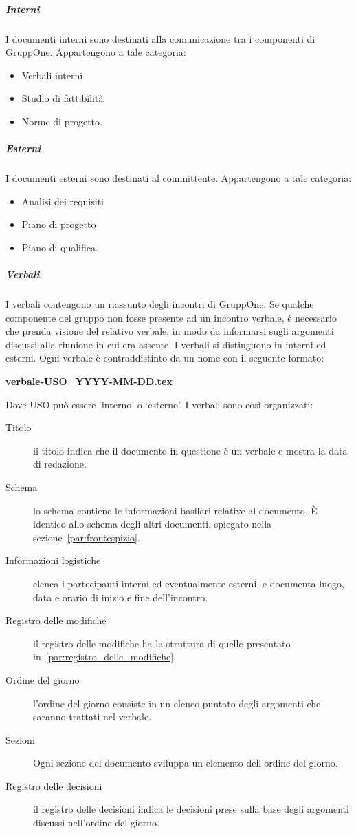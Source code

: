 \documentclass[../norme-di-progetto.tex]{subfiles}
\begin{document}
\subparagraph{Interni}%
\label{subp:suddivisione_dei_documenti/interni}
I documenti interni sono destinati alla comunicazione tra i componenti di GruppOne. Appartengono a tale categoria:

\begin{itemize}
  \item Verbali interni
  \item Studio di fattibilità
  \item Norme di progetto.
\end{itemize}

\subparagraph{Esterni}%
\label{subp:suddivisione_dei_documenti/esterni}
I documenti esterni sono destinati al committente. Appartengono a tale categoria:

\begin{itemize}
  \item Analisi dei requisiti
  \item Piano di progetto
  \item Piano di qualifica.
\end{itemize}

\subparagraph{Verbali}%
\label{subp:verbali}
I verbali contengono un riassunto degli incontri di GruppOne.
Se qualche componente del gruppo non fosse presente ad un incontro verbale, è necessario che prenda visione del relativo verbale, in modo da informarsi sugli argomenti discussi alla riunione in cui era assente.
I verbali si distinguono in interni ed esterni. Ogni verbale è contraddistinto da un nome con il seguente formato:
\begin{center}
  \textbf{verbale-USO_YYYY-MM-DD.tex}
\end{center}
Dove USO può essere `interno' o `esterno'. I verbali sono così organizzati:

\begin{description}
  \item [Titolo] il titolo indica che il documento in questione è un verbale e mostra la data di redazione.
  \item [Schema] lo schema contiene le informazioni basilari relative al documento. È identico allo schema degli altri documenti, spiegato nella sezione~\ref{par:frontespizio}.
  \item [Informazioni logistiche] elenca i partecipanti interni ed eventualmente esterni, e documenta luogo, data e orario di inizio e fine dell'incontro.
  \item [Registro delle modifiche] il registro delle modifiche ha la struttura di quello presentato in~\ref{par:registro_delle_modifiche}.
  \item [Ordine del giorno] l'ordine del giorno consiste in un elenco puntato degli argomenti che saranno trattati nel verbale.
  \item [Sezioni] Ogni sezione del documento sviluppa un elemento dell'ordine del giorno.
  \item [Registro delle decisioni] il registro delle decisioni indica le decisioni prese sulla base degli argomenti discussi nell'ordine del giorno.
\end{description}
\end{document}

